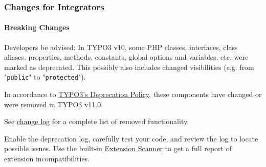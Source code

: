 %

\begin{frame}[fragile]
	\frametitle{Changes for Integrators}
	\framesubtitle{Breaking Changes}

	\small
		Developers be advised: In TYPO3 v10, some PHP classes, interfaces, class aliases,
		properties, methods, constants, global options and variables, etc. were marked
		as deprecated. This possibly also includes changed visibilities (e.g. from
		"\texttt{public}" to "\texttt{protected}").

		\vspace{0.2cm}

		In accordance to
		\href{https://typo3.org/article/typo3-deprecation-policy}{TYPO3's Deprecation Policy},
		these components have changed or were removed in TYPO3 v11.0.

		\vspace{0.2cm}

		See \href{https://docs.typo3.org/c/typo3/cms-core/master/en-us/Changelog/master/Breaking-91473-DeprecatedFunctionalityRemoved.html}{change log}
		for a complete list of removed functionality.

		\vspace{0.2cm}

		Enable the deprecation log, carefully test your code, and review the log to
		locate possible issues. Use the built-in
		\href{https://docs.typo3.org/m/typo3/reference-coreapi/master/en-us/ApiOverview/ExtensionScanner/Index.html}{Extension Scanner}
		to get a full report of extension incompatibilities.

	\normalsize

\end{frame}

